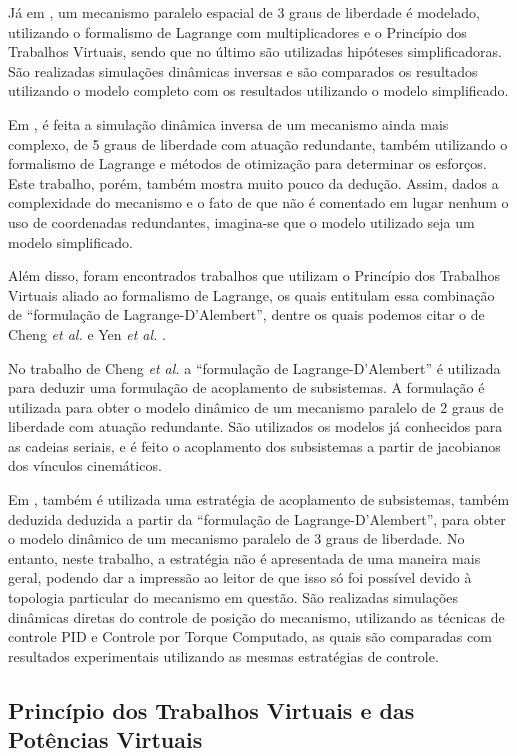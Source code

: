 \documentclass[]{politex}
\begin{document}
Já em \cite{Li3}, um mecanismo paralelo espacial de 3 graus de liberdade é modelado, utilizando o formalismo de Lagrange com multiplicadores e o Princípio dos Trabalhos Virtuais, sendo que no último são utilizadas hipóteses simplificadoras. São realizadas simulações dinâmicas inversas e são comparados os resultados utilizando o modelo completo com os resultados utilizando o modelo simplificado.

Em \cite{Yao}, é feita a simulação dinâmica inversa de um mecanismo ainda mais complexo, de 5 graus de liberdade com atuação redundante, também utilizando o formalismo de Lagrange e métodos de otimização para determinar os esforços. Este trabalho, porém, também mostra muito pouco da dedução. Assim, dados a complexidade do mecanismo e o fato de que não é comentado em lugar nenhum o uso de coordenadas redundantes, imagina-se que o modelo utilizado seja um modelo simplificado.

Além disso, foram encontrados trabalhos que utilizam o Princípio dos Trabalhos Virtuais aliado ao formalismo de Lagrange, os quais entitulam essa combinação de ``formulação de Lagrange-D’Alembert'', dentre os quais podemos citar o de Cheng \emph{et al.} \cite{ChengLiu} e Yen \emph{et al.} \cite{Yen}.

No trabalho de Cheng \emph{et al.} \cite{ChengLiu} a ``formulação de Lagrange-D’Alembert'' é utilizada para deduzir uma formulação de acoplamento de subsistemas. A formulação é utilizada para obter o modelo dinâmico de um mecanismo paralelo de 2 graus de liberdade com atuação redundante. São utilizados os modelos já conhecidos para as cadeias seriais, e é feito o acoplamento dos subsistemas a partir de jacobianos dos vínculos cinemáticos.

Em \cite{Yen}, também é utilizada uma estratégia de acoplamento de subsistemas, também deduzida deduzida a partir da ``formulação de Lagrange-D’Alembert'', para obter o modelo dinâmico de um mecanismo paralelo de 3 graus de liberdade. No entanto, neste trabalho, a estratégia não é apresentada de uma maneira mais geral, podendo dar a impressão ao leitor de que isso só foi possível devido à topologia particular do mecanismo em questão. São realizadas simulações dinâmicas diretas do controle de posição do mecanismo, utilizando as técnicas de controle PID e Controle por Torque Computado, as quais são comparadas com resultados experimentais utilizando as mesmas estratégias de controle.

\subsection{Princípio dos Trabalhos Virtuais e das Potências Virtuais}
\end{document}
